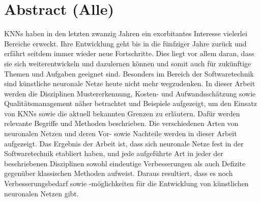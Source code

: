 \section*{Abstract (Alle)}
KNNs haben in den letzten zwanzig Jahren ein exorbitantes Interesse vielerlei Bereiche erweckt. Ihre Entwicklung geht bis in die fünfziger Jahre zurück und erfährt seitdem immer wieder neue Fortschritte. Dies liegt vor allem daran, dass sie sich weiterentwickeln und dazulernen können und somit auch für zukünftige Themen und Aufgaben geeignet sind. Besonders im Bereich der Softwaretechnik sind künstliche neuronale Netze heute nicht mehr wegzudenken. In dieser Arbeit werden die Disziplinen Mustererkennung, Kosten- und Aufwandsschätzung sowie Qualitätsmanagement näher betrachtet und Beispiele aufgezeigt, um den Einsatz von KNNs sowie die aktuell bekannten Grenzen zu erläutern. Dafür werden relevante Begriffe und Methoden beschrieben. Die verschiedenen Arten von neuronalen Netzen und deren Vor- sowie Nachteile werden in dieser Arbeit aufgezeigt. Das Ergebnis der Arbeit ist, dass sich neuronale Netze fest in der Softwaretechnik etabliert haben, und jede aufgeführte Art in jeder der beschriebenen Disziplinen sowohl eindeutige Verbesserungen als auch Defizite gegenüber klassischen Methoden aufweist. Daraus resultiert, dass es noch Verbesserungsbedarf sowie -möglichkeiten für die Entwicklung von künstlichen neuronalen Netzen gibt.
